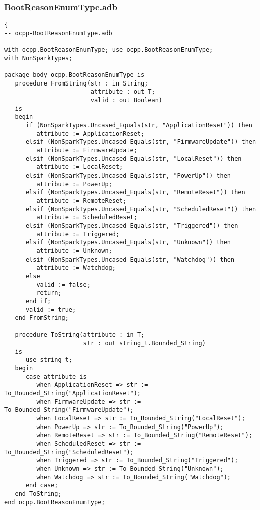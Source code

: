 \documentclass[12pt,openany,a4paper]{book}
\begin{document}
\subsubsection{BootReasonEnumType.adb}
\begin{verbatim}
{
-- ocpp-BootReasonEnumType.adb

with ocpp.BootReasonEnumType; use ocpp.BootReasonEnumType;
with NonSparkTypes;

package body ocpp.BootReasonEnumType is
   procedure FromString(str : in String;
                        attribute : out T;
                        valid : out Boolean)
   is
   begin
      if (NonSparkTypes.Uncased_Equals(str, "ApplicationReset")) then
         attribute := ApplicationReset;
      elsif (NonSparkTypes.Uncased_Equals(str, "FirmwareUpdate")) then
         attribute := FirmwareUpdate;
      elsif (NonSparkTypes.Uncased_Equals(str, "LocalReset")) then
         attribute := LocalReset;
      elsif (NonSparkTypes.Uncased_Equals(str, "PowerUp")) then
         attribute := PowerUp;
      elsif (NonSparkTypes.Uncased_Equals(str, "RemoteReset")) then
         attribute := RemoteReset;
      elsif (NonSparkTypes.Uncased_Equals(str, "ScheduledReset")) then
         attribute := ScheduledReset;
      elsif (NonSparkTypes.Uncased_Equals(str, "Triggered")) then
         attribute := Triggered;
      elsif (NonSparkTypes.Uncased_Equals(str, "Unknown")) then
         attribute := Unknown;
      elsif (NonSparkTypes.Uncased_Equals(str, "Watchdog")) then
         attribute := Watchdog;
      else
         valid := false;
         return;
      end if;
      valid := true;
   end FromString;

   procedure ToString(attribute : in T;
                      str : out string_t.Bounded_String)
   is
      use string_t;
   begin
      case attribute is
         when ApplicationReset => str := To_Bounded_String("ApplicationReset");
         when FirmwareUpdate => str := To_Bounded_String("FirmwareUpdate");
         when LocalReset => str := To_Bounded_String("LocalReset");
         when PowerUp => str := To_Bounded_String("PowerUp");
         when RemoteReset => str := To_Bounded_String("RemoteReset");
         when ScheduledReset => str := To_Bounded_String("ScheduledReset");
         when Triggered => str := To_Bounded_String("Triggered");
         when Unknown => str := To_Bounded_String("Unknown");
         when Watchdog => str := To_Bounded_String("Watchdog");
      end case;
   end ToString;
end ocpp.BootReasonEnumType;
\end{verbatim}
\end{document}
